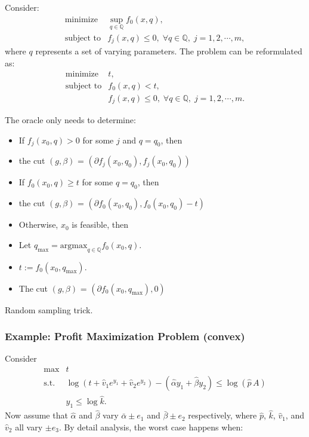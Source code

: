 \documentclass[final,leqno]{siamltex}
\providecommand{\tightlist}{%
  \setlength{\itemsep}{0pt}\setlength{\parskip}{0pt}}
\begin{document}
Consider:
\begin{equation}\begin{array}{ll}
    \text{minimize}   & \sup_{q \in \mathbb Q} f_0(x,q), \\
    \text{subject to} & f_j(x,q) \leq 0, \;
            \forall q \in {\mathbb Q}, \; j = 1,2,\cdots,m,
  \end{array}
\label{eq:robust-optim}\end{equation}
where \(q\) represents a set of varying parameters. The problem can be reformulated as:
\[\begin{array}{ll}
    \text{minimize}   & t, \\
    \text{subject to} & f_0(x,q) < t,  \\
                      & f_j(x,q) \leq 0, \;
            \forall q \in {\mathbb Q}, \; j = 1,2,\cdots,m.
  \end{array}
\]

The oracle only needs to determine:

\begin{itemize}
\tightlist
\item
  If \(f_j(x_0, q) > 0\) for some \(j\) and \(q = q_0\), then
\item
  the cut \((g, \beta)\) = \((\partial f_j(x_0, q_0), f_j(x_0, q_0))\)
\item
  If \(f_0(x_0, q) \ge t\) for some \(q = q_0\), then
\item
  the cut \((g, \beta)\) = \((\partial f_0(x_0, q_0), f_0(x_0, q_0) - t)\)
\item
  Otherwise, \(x_0\) is feasible, then
\item
  Let \(q_{\max} = \text{argmax}_{q \in \mathbb Q} f_0(x_0, q)\).
\item
  \(t := f_0(x_0, q_{\max})\).
\item
  The cut \((g, \beta)\) = \((\partial f_0(x_0, q_{\max}), 0)\)
\end{itemize}

Random sampling trick.

\hypertarget{sec:example-profit-maximization-problem-convex}{%
\subsubsection{Example: Profit Maximization Problem (convex)}\label{sec:example-profit-maximization-problem-convex}}

Consider
\[\begin{array}{ll}
    \text{max}  & t \\
    \text{s.t.} & \log(t + \hat{v}_1 e^{y_1} + \hat{v}_2 e^{y_2}) - 
                        (\hat{\alpha} y_1 + \hat{\beta} y_2) \le \log(\hat{p}\,A)  \\
                & y_1 \le \log \hat{k} .
  \end{array}
\]
Now assume that \(\hat{\alpha}\) and \(\hat{\beta}\) vary \(\bar{\alpha} \pm e_1\) and \(\bar{\beta} \pm e_2\) respectively, where \(\hat{p}\), \(\hat{k}\), \(\hat{v}_1\), and \(\hat{v}_2\) all vary \(\pm e_3\). By detail analysis, the worst case happens when:
\end{document}
